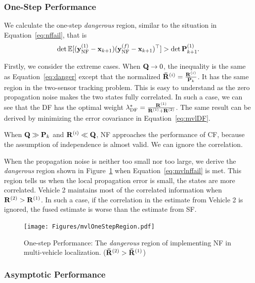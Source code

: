 \subsubsection{One-Step Performance}

We calculate the one-step \textit{dangerous} region, similar to the situation in Equation~\eqref{eq:nffail}, that is
\begin{equation}
 \det\mathbb{E}[({\bf y}^{(1)}_{\text{NF}}-{\bf x}_{k+1})({\bf y}^{(f)}_{\text{NF}}-{\bf x}_{k+1})^\top]>\det{\bf P}_{k+1}^{(1)}.  
 \label{eq:mvlnffail}
\end{equation}

Firstly, we consider the extreme cases. When ${\bf Q}\rightarrow 0$, the inequality is the same as Equation~\eqref{eq:danger} except that the normalized ${\bf\bar R}^{(i)}=\frac{{\bf R}^{(i)}}{{\bf P}_k}$. It has the same region in the two-sensor tracking problem. This is easy to understand as the zero propagation noise makes the two states fully correlated. In such a case, we can see that the DF has the optimal weight $\lambda^*_\text{DF}=\frac{{\bf R}^{(1)}}{{\bf R}^{(1)}+{\bf R}^{(2)}}$. The same result can be derived by minimizing the error covariance in Equation~\eqref{eq:mvlDF}.

When ${\bf Q}\gg{\bf P}_k$ and ${\bf R}^{(i)}\ll{\bf Q}$, NF approaches the performance of CF, because the assumption of independence is almost valid. We can ignore the correlation.

When the propagation noise is neither too small nor too large, we derive the \textit{dangerous} region shown in Figure~\ref{fig:mvlOneStepRegion} when Equation~\eqref{eq:mvlnffail} is met. This region tells us when the local propagation error is small, the states are more correlated. Vehicle 2 maintains most of the correlated information when ${\bf R}^{(2)}>{\bf R}^{(1)}$. In such a case, if the correlation in the estimate from Vehicle 2 is ignored, the fused estimate is worse than the estimate from SF.

\begin{figure}[htbp]
  \centering
    \texttt{[image: Figures/mvlOneStepRegion.pdf]}
      \caption{One-step Performance: The \textit{dangerous} region of implementing NF in multi-vehicle localization. (${\bf\bar R}^{(2)}>{\bf\bar R}^{(1)}$)}
      \label{fig:mvlOneStepRegion}
\end{figure}


\subsubsection{Asymptotic Performance}

